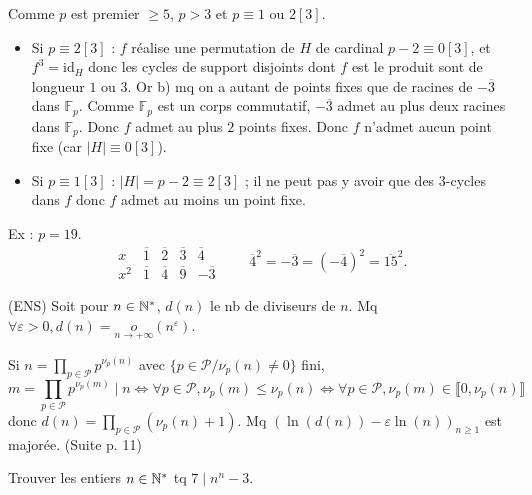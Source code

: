 \begin{solution}
Comme $p$ est premier $\geq 5$, $p > 3$ et $p \equiv 1 \text{ ou } 2 [3]$.
\begin{itemize}
  \item Si $p \equiv 2 [3]$ : $f$ réalise une permutation de $H$ de cardinal $p - 2 \equiv 0 [3]$, et $f^3 = \mathrm{id}_H$ donc les cycles de support disjoints dont $f$ est le produit sont de longueur $1$ ou $3$.
  Or b) mq on a autant de points fixes que de racines de $-\overline{3}$ dans $\mathbb{F}_p$. Comme $\mathbb{F}_p$ est un corps commutatif, $-\overline{3}$ admet au plus deux racines dans $\mathbb{F}_p$.
  Donc $f$ admet au plus $2$ points fixes. Donc $f$ n'admet aucun point fixe (car $|H| \equiv 0 [3]$).
  \item Si $p \equiv 1 [3]$ : $|H| = p - 2 \equiv 2 [3]$ ; il ne peut pas y avoir que des $3$-cycles dans $f$ donc $f$ admet au moins un point fixe.
\end{itemize}
Ex : $p = 19$.
\[ \begin{array}{c|c|c|c|c} x & \overline{1} & \overline{2} & \overline{3} & \overline{4} \\ \hline x^2 & \overline{1} & \overline{4} & \overline{9} & -\overline{3} \end{array} \qquad \overline{4}^2 = -\overline{3} = (-\overline{4})^2 = \overline{15}^2. \]
\end{solution}


\begin{statementbox}
(ENS) Soit pour $n \in \mathbb N^*$, $d(n)$ le nb de diviseurs de $n$.
Mq $\forall \varepsilon > 0, d(n) = \underset{n \to +\infty}{o}(n^\varepsilon)$.
\end{statementbox}

\begin{solution}
Si $n = \prod_{p \in \mathcal{P}} p^{\nu_p(n)}$ avec $\{p \in \mathcal{P} / \nu_p(n) \neq 0\}$ fini,
\[ m = \prod_{p \in \mathcal{P}} p^{\nu_p(m)} \mid n \iff \forall p \in \mathcal{P}, \nu_p(m) \leq \nu_p(n) \iff \forall p \in \mathcal{P}, \nu_p(m) \in \llbracket 0, \nu_p(n) \rrbracket \]
donc $d(n) = \prod_{p \in \mathcal{P}} (\nu_p(n) + 1)$.
Mq $(\ln(d(n)) - \varepsilon \ln(n))_{n \geq 1}$ est majorée. (Suite p. 11)
\end{solution}


\begin{statementbox}
Trouver les entiers $n \in \mathbb N^*$ tq $7 \mid n^n - 3$.
\end{statementbox}

